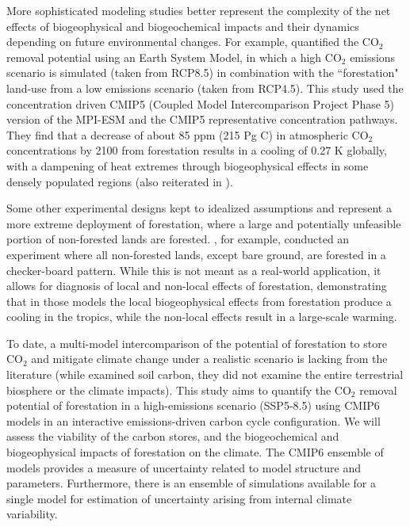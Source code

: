 \documentclass[draft]{agujournal2019}
\begin{document}
More sophisticated modeling studies better represent the complexity of the net effects of biogeophysical and biogeochemical impacts and their dynamics depending on future environmental changes.
For example,  quantified the CO$_2$ removal potential using an Earth System Model, in which a high CO$_2$ emissions scenario is simulated (taken from RCP8.5) in combination with the ``forestation" land-use from a low emissions scenario (taken from RCP4.5).
This study used the concentration driven CMIP5 (Coupled Model Intercomparison Project Phase 5) version of the MPI-ESM and the CMIP5 representative concentration pathways.
They find that a decrease of about 85 ppm (215 Pg C) in atmospheric CO$_2$ concentrations by 2100 from forestation results in a cooling of 0.27 K globally, with a dampening of heat extremes through biogeophysical effects in some densely populated regions (also reiterated in ).

Some other experimental designs kept to idealized assumptions and represent a more extreme deployment of forestation, where a large and potentially unfeasible portion of non-forested lands are forested.
, for example, conducted an experiment where all non-forested lands, except bare ground, are forested in a checker-board pattern.
While this is not meant as a real-world application, it allows for diagnosis of local and non-local effects of forestation, demonstrating that in those models the local biogeophysical effects from forestation produce a cooling in the tropics, while the non-local effects result in a large-scale warming.

To date, a multi-model intercomparison of the potential of forestation to store CO$_2$ and mitigate climate change under a realistic scenario is lacking from the literature (while  examined soil carbon, they did not examine the entire terrestrial biosphere or the climate impacts).
This study aims to quantify the CO$_2$ removal potential of forestation  in a high-emissions scenario (SSP5-8.5) using CMIP6 models in an interactive emissions-driven carbon cycle configuration.
We will assess the viability of the carbon stores, and the biogeochemical and biogeophysical impacts of forestation on the climate.
The CMIP6 ensemble of models provides a measure of uncertainty related to model structure and parameters.
Furthermore, there is an ensemble of simulations available for a single model for estimation of uncertainty arising from internal climate variability. 
\end{document}
